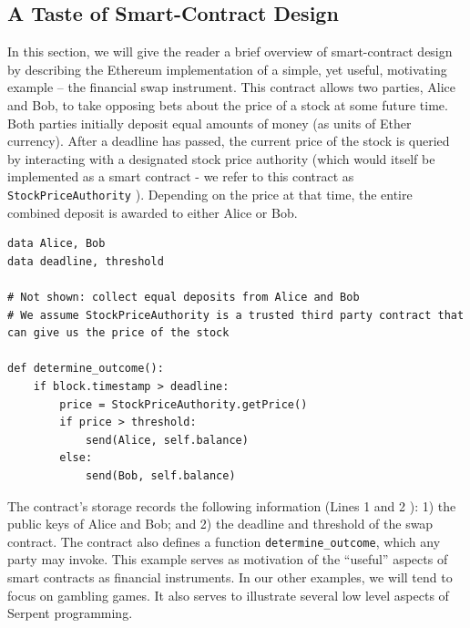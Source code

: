 \documentclass[10pt,twocolumn,letterpaper]{article}
\newcommand{\elaine}[1]{}
\begin{document}
\subsection{A Taste of Smart-Contract Design}

In this section, we will give the reader a brief overview of smart-contract design by describing the Ethereum implementation of a simple, yet useful, motivating example -- the financial swap instrument. This contract allows two parties, Alice and Bob, to take opposing bets about the price of a stock at some future time. Both parties initially deposit equal amounts of money (as units of Ether currency). After a deadline has passed, the current price of the stock is queried by interacting with a designated stock price authority (which would itself be implemented as a smart contract - we refer to this contract as \texttt{StockPriceAuthority} ). Depending on the price at that time, the entire combined deposit is awarded to either Alice or Bob.

\begin{mdframed}
\begin{verbatim}
data Alice, Bob
data deadline, threshold

# Not shown: collect equal deposits from Alice and Bob
# We assume StockPriceAuthority is a trusted third party contract that can give us the price of the stock

def determine_outcome():
    if block.timestamp > deadline: 
        price = StockPriceAuthority.getPrice()
        if price > threshold:
            send(Alice, self.balance)
        else:
            send(Bob, self.balance)
\end{verbatim}
\end{mdframed}

The contract's storage 
records the following information (Lines 1 and 2 \elaine{hard coded}): 
1) the public keys of Alice and Bob;
and 2) the deadline and threshold 
of the swap contract.
The contract also defines 
a function \texttt{determine\_outcome}, which any party may invoke.
This example serves as motivation of the ``useful'' aspects of smart contracts as financial instruments. In our other examples, we will tend to focus on gambling games. It also serves to illustrate several low level aspects of Serpent programming.
\end{document}
